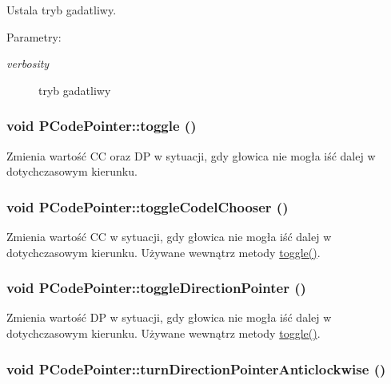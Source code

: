 Ustala tryb gadatliwy. \begin{Desc}
\item[Parametry:]
\begin{description}
\item[{\em verbosity}]tryb gadatliwy \end{description}
\end{Desc}
\hypertarget{classPCodePointer_5b34ab0f6bb3ddb3bd7e44a7d9a613ca}{
\subsubsection[{toggle}]{\setlength{\rightskip}{0pt plus 5cm}void PCodePointer::toggle ()}}
\label{classPCodePointer_5b34ab0f6bb3ddb3bd7e44a7d9a613ca}


Zmienia wartość CC oraz DP w sytuacji, gdy głowica nie mogła iść dalej w dotychczasowym kierunku. \hypertarget{classPCodePointer_56d2ef632779fbe64937030e82b027d1}{
\subsubsection[{toggleCodelChooser}]{\setlength{\rightskip}{0pt plus 5cm}void PCodePointer::toggleCodelChooser ()}}
\label{classPCodePointer_56d2ef632779fbe64937030e82b027d1}


Zmienia wartość CC w sytuacji, gdy głowica nie mogła iść dalej w dotychczasowym kierunku. Używane wewnątrz metody \hyperlink{classPCodePointer_5b34ab0f6bb3ddb3bd7e44a7d9a613ca}{toggle()}. \hypertarget{classPCodePointer_4aab1f30e01bb0fb3d78b5e6aa93535c}{
\subsubsection[{toggleDirectionPointer}]{\setlength{\rightskip}{0pt plus 5cm}void PCodePointer::toggleDirectionPointer ()}}
\label{classPCodePointer_4aab1f30e01bb0fb3d78b5e6aa93535c}


Zmienia wartość DP w sytuacji, gdy głowica nie mogła iść dalej w dotychczasowym kierunku. Używane wewnątrz metody \hyperlink{classPCodePointer_5b34ab0f6bb3ddb3bd7e44a7d9a613ca}{toggle()}. \hypertarget{classPCodePointer_3f43e8205a0554bf7baa3821e01ab4a2}{
\subsubsection[{turnDirectionPointerAnticlockwise}]{\setlength{\rightskip}{0pt plus 5cm}void PCodePointer::turnDirectionPointerAnticlockwise ()}}
\label{classPCodePointer_3f43e8205a0554bf7baa3821e01ab4a2}



